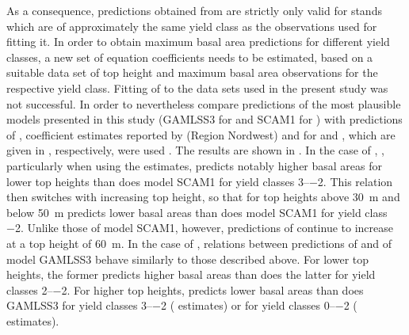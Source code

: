 As a consequence, predictions obtained from  are strictly only valid for stands which are of approximately the same yield class as the observations used for fitting it.  In order to obtain maximum basal area predictions for different yield classes, a new set of equation coefficients needs to be estimated, based on a suitable data set of top height and maximum basal area observations for the respective yield class.
Fitting of  to the data sets used in the present study was not successful.  In order to nevertheless compare predictions of the most plausible models presented in this study (GAMLSS3 for \Beech{} and SCAM1 for \Spruce{}) with predictions of , coefficient estimates reported by \textcite{Doebbeler2004} (Region Nordwest) and \textcite{Woerdehoff2016} for \Beech{} and \Spruce{}, which are given in , respectively, were used .  The results are shown in .  In the case of \Beech{}, , particularly when using the \textcite{Doebbeler2004} estimates, predicts notably higher basal areas for lower top heights than does model SCAM1 for yield classes \numrange{3}{-2}.  This relation then switches with increasing top height, so that for top heights above \SI{30}{\meter} and below \SI{50}{\meter}  predicts lower basal areas than does model SCAM1 for yield class \num{-2}.  Unlike those of model SCAM1, however, predictions of  continue to increase at a top height of \SI{60}{\meter}.  In the case of \Spruce{}, relations between predictions of  and of model GAMLSS3 behave similarly to those described above.  For lower top heights, the former predicts higher basal areas than does the latter for yield classes \numrange{2}{-2}.  For higher top heights,  predicts lower basal areas than does GAMLSS3 for yield classes \numrange{3}{-2} (\textcite{Woerdehoff2016} estimates) or for yield classes \numrange{0}{-2} (\textcite{Doebbeler2004} estimates).  \\
